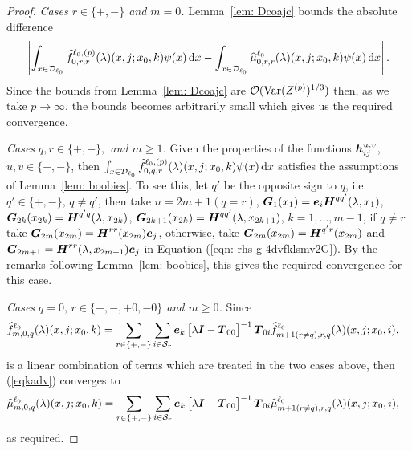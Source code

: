\begin{proof}
	\textit{Cases \(r \in \{+,-\}\) and \(m=0\).} Lemma~\ref{lem: Dcoajc} bounds the absolute difference 
	\[\left|\int_{x\in\mathcal{D}_{\ell_0}}\widehat f_{0,r,r}^{\ell_0,(p)}(\lambda)(x,j;x_0,k)\psi(x)\, \mathrm{d} x-\int_{x\in\mathcal{D}_{\ell_0}}\widehat \mu_{0,r,r}^{\ell_0}(\lambda)(x,j;x_0,k)\psi(x)\, \mathrm{d} x\right|.\]
	Since the bounds from Lemma~\ref{lem: Dcoajc} are \(\mathcal O(\mathrm{Var}(Z^{(p)})^{1/3})\) then, as we take \(p \to \infty\), the bounds becomes arbitrarily small which gives us the required convergence. 

	\textit{Cases \(q,r\in \{+,-\},\) and \(m\geq 1\).} Given the properties of the functions \(\boldsymbol h_{ij}^{u,v}\), \(u,v\in\{+,-\}\), then \(\int_{x\in\mathcal{D}_{\ell_0}}\widehat f_{0,q,r}^{\ell_0,(p)}(\lambda)(x,j;x_0,k)\psi(x)\, \mathrm{d} x\) satisfies the assumptions of Lemma~\ref{lem: boobies}. To see this, let \(q'\) be the opposite sign to \(q\), i.e.~\(q'\in\{+,-\},\, q\neq q'\), then take \(n=2m+1(q=r)\), \(\boldsymbol G_1(x_1) = \boldsymbol e_i\boldsymbol H^{qq'}(\lambda, x_1)\), \(\boldsymbol G_{2k}(x_{2k}) = \boldsymbol H^{q'q}(\lambda, x_{2k})\), \(\boldsymbol G_{2k+1}(x_{2k}) = \boldsymbol H^{qq'}(\lambda, x_{2k+1})\), \(k=1,\dots,m-1\), if \(q\neq r\) take \(\boldsymbol G_{2m}(x_{2m}) = \boldsymbol H^{rr}(x_{2m})\boldsymbol e_j\), otherwise, take \(\boldsymbol G_{2m}(x_{2m}) = \boldsymbol H^{q'r}(x_{2m})\) and \(\boldsymbol G_{2m+1} = \boldsymbol H^{rr}(\lambda,x_{2m+1})\boldsymbol e_j\) in Equation (\ref{eqn: rhs g 4dvfklsmv2G}). By the remarks following Lemma~\ref{lem: boobies}, this gives the required convergence for this case. 

	\textit{Cases \(q=0,\, r\in\{+,-,+0,-0\}\) and \(m\geq 0\).} 
	Since
	\begin{align}
		\widehat f_{m,0,q}^{\ell_0}(\lambda)(x,j;x_0,k)  
		&= \sum_{r\in\{+,-\}}\sum_{i\in\mathcal{S}_r}\boldsymbol e_k\begin{bmatrix} \lambda \boldsymbol I - \boldsymbol T_{00} \end{bmatrix}^{-1}\boldsymbol T_{0i}\widehat f_{m+1(r\neq q),r,q}^{\ell_0}(\lambda)(x,j;x_0,i), \label{eqkadv}
	\end{align}
	is a linear combination of terms which are treated in the two cases above, then (\ref{eqkadv}) converges to 
	\begin{align}
		\widehat \mu_{m,0,q}^{\ell_0}(\lambda)(x,j;x_0,k) 
		&= \sum_{r\in\{+,-\}}\sum_{i\in\mathcal{S}_r}\boldsymbol e_k\begin{bmatrix} \lambda \boldsymbol I - \boldsymbol T_{00} \end{bmatrix}^{-1}\boldsymbol T_{0i}\widehat \mu_{m+1(r\neq q),r,q}^{\ell_0}(\lambda)(x,j;x_0,i),
	\end{align}
	as required. 
\end{proof}

